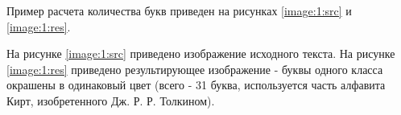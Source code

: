 Пример расчета количества букв приведен на рисунках \ref{image:1:src} и \ref{image:1:res}.

На рисунке \ref{image:1:src} приведено изображение исходного текста.
На рисунке \ref{image:1:res} приведено результирующее изображение - буквы одного класса окрашены в одинаковый цвет (всего - 31 буква, используется часть алфавита Кирт, изобретенного Дж. Р. Р. Толкином).


